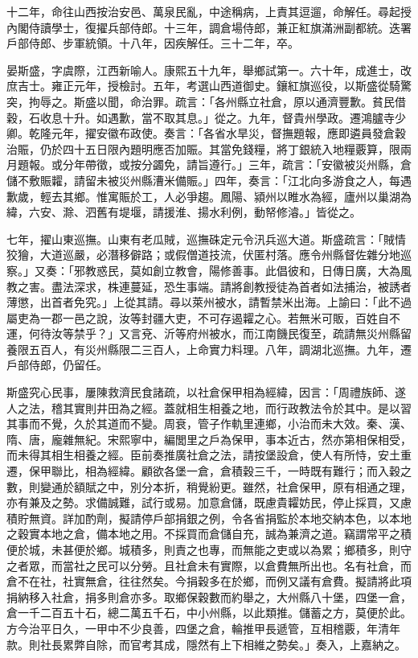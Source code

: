 \begin{pinyinscope}
十二年，命往山西按治安邑、萬泉民亂，中途稱病，上責其逗遛，命解任。尋起授內閣侍讀學士，復擢兵部侍郎。十三年，調倉場侍郎，兼正紅旗滿洲副都統。迭署戶部侍郎、步軍統領。十八年，因疾解任。三十二年，卒。

晏斯盛，字虞際，江西新喻人。康熙五十九年，舉鄉試第一。六十年，成進士，改庶吉士。雍正元年，授檢討。五年，考選山西道御史。鑲紅旗巡役，以斯盛從騎驚突，拘辱之。斯盛以聞，命治罪。疏言：「各州縣立社倉，原以通濟豐歉。貧民借穀，石收息十升。如遇歉，當不取其息。」從之。九年，督貴州學政。遷鴻臚寺少卿。乾隆元年，擢安徽布政使。奏言：「各省水旱災，督撫題報，應即遴員發倉穀治賑，仍於四十五日限內題明應否加賑。其當免錢糧，將丁銀統入地糧覈算，限兩月題報。或分年帶徵，或按分蠲免，請旨遵行。」三年，疏言：「安徽被災州縣，倉儲不敷賑糶，請留未被災州縣漕米備賑。」四年，奏言：「江北向多游食之人，每遇歉歲，輕去其鄉。惟寓賑於工，人必爭趨。鳳陽、潁州以睢水為經，廬州以巢湖為緯，六安、滁、泗舊有堤堰，請援淮、揚水利例，動帑修濬。」皆從之。

七年，擢山東巡撫。山東有老瓜賊，巡撫硃定元令汛兵巡大道。斯盛疏言：「賊情狡獪，大道巡嚴，必潛移僻路；或假僧道技流，伏匿村落。應令州縣督佐雜分地巡察。」又奏：「邪教惑民，莫如創立教會，陽修善事。此倡彼和，日傳日廣，大為風教之害。盡法深求，株連蔓延，恐生事端。請將創教授徒為首者如法捕治，被誘者薄懲，出首者免究。」上從其請。尋以萊州被水，請暫禁米出海。上諭曰：「此不過屬吏為一郡一邑之說，汝等封疆大吏，不可存遏糶之心。若無米可販，百姓自不運，何待汝等禁乎？」又言兗、沂等府州被水，而江南饑民復至，疏請無災州縣留養限五百人，有災州縣限二三百人，上命實力料理。八年，調湖北巡撫。九年，遷戶部侍郎，仍留任。

斯盛究心民事，屢陳救濟民食諸疏，以社倉保甲相為經緯，因言：「周禮族師、遂人之法，稽其實則井田為之經。蓋就相生相養之地，而行政教法令於其中。是以習其事而不覺，久於其道而不變。周衰，管子作軌里連鄉，小治而未大效。秦、漢、隋、唐，龐雜無紀。宋熙寧中，編閭里之戶為保甲，事本近古，然亦第相保相受，而未得其相生相養之經。臣前奏推廣社倉之法，請按堡設倉，使人有所恃，安土重遷，保甲聯比，相為經緯。顧欲各堡一倉，倉積穀三千，一時既有難行；而入穀之數，則變通於額賦之中，別分本折，稍覺紛更。雖然，社倉保甲，原有相通之理，亦有兼及之勢。求備誠難，試行或易。加意倉儲，既慮貴糶妨民，停止採買，又慮積貯無資。詳加酌劑，擬請停戶部捐銀之例，令各省捐監於本地交納本色，以本地之穀實本地之倉，備本地之用。不採買而倉儲自充，誠為兼濟之道。竊謂常平之積便於城，未甚便於鄉。城積多，則責之也專，而無能之吏或以為累；鄉積多，則守之者眾，而當社之民可以分勞。且社倉未有實際，以倉費無所出也。名有社倉，而倉不在社，社實無倉，往往然矣。今捐穀多在於鄉，而例又議有倉費。擬請將此項捐納移入社倉，捐多則倉亦多。取鄉保穀數而約舉之，大州縣八十堡，四堡一倉，倉一千二百五十石，總二萬五千石，中小州縣，以此類推。儲蓄之方，莫便於此。方今治平日久，一甲中不少良善，四堡之倉，輪推甲長遞管，互相稽覈，年清年款。則社長累弊自除，而官考其成，隱然有上下相維之勢矣。」奏入，上嘉納之。


\end{pinyinscope}
